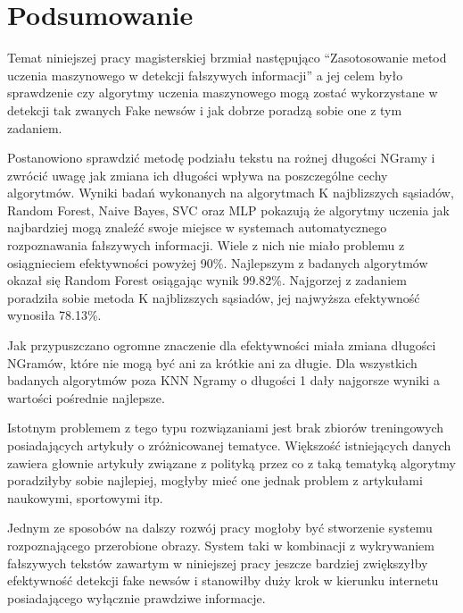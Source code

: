 \chapter{Podsumowanie}
Temat niniejszej pracy magisterskiej brzmiał następująco 
``Zasotosowanie metod uczenia maszynowego w detekcji fałszywych informacji'' 
a jej celem było sprawdzenie czy algorytmy uczenia maszynowego mogą zostać wykorzystane
w detekcji tak zwanych Fake newsów i jak dobrze poradzą sobie one z tym zadaniem.


Postanowiono sprawdzić metodę podziału tekstu na rożnej długości NGramy i zwrócić uwagę 
jak zmiana ich długości wpływa na poszczególne cechy algorytmów.
Wyniki badań wykonanych na algorytmach K najblizszych sąsiadów, Random Forest, Naive Bayes,
SVC oraz MLP pokazują że algorytmy uczenia jak najbardziej mogą znaleźć swoje miejsce w systemach
automatycznego rozpoznawania fałszywych informacji. Wiele z nich nie miało problemu z osiągnieciem 
efektywności powyżej 90\%. Najlepszym z badanych algorytmów okazał się Random Forest osiągając
wynik 99.82\%. Najgorzej z zadaniem poradziła sobie metoda K najblizszych sąsiadów, jej najwyższa 
efektywność wynosiła 78.13\%.

Jak przypuszczano ogromne znaczenie dla efektywności
miała zmiana długości NGramów, które nie mogą być ani za krótkie ani za długie.
Dla wszystkich badanych algorytmów poza KNN Ngramy o długości 1 dały najgorsze wyniki a wartości
pośrednie najlepsze.

Istotnym problemem z tego typu rozwiązaniami jest brak zbiorów treningowych posiadających 
artykuły o zróżnicowanej tematyce. Większość istniejących danych zawiera głownie artykuły związane z 
polityką przez co z taką tematyką algorytmy poradziłyby sobie najlepiej, mogłyby mieć one jednak problem 
z artykułami naukowymi, sportowymi itp.

Jednym ze sposobów na dalszy rozwój pracy mogłoby być stworzenie systemu rozpoznającego 
przerobione obrazy. System taki w kombinacji z wykrywaniem fałszywych tekstów zawartym
w niniejszej pracy jeszcze bardziej zwiększyłby efektywność detekcji fake newsów i stanowiłby 
duży krok w kierunku internetu posiadającego wyłącznie prawdziwe informacje.